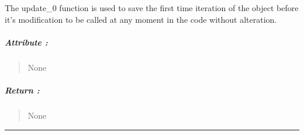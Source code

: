 \documentclass[letterpaper,10pt,english]{sphinxmanual}
\begin{document}
\begin{fulllineitems}
\label{\detokenize{GRID_doc/TIME_GRID_doc:SL_C0de.grid.TIME_GRID.update_0}}
\pysigstartsignatures
{}
\pysigstopsignatures
\sphinxAtStartPar
The \label{\detokenize{GRID_doc/TIME_GRID_doc:update-0}}update\_0 function is used to save the first time iteration of the object before it’s modification to be called at any moment in the code without alteration.


\subparagraph{Attribute :}
\label{\detokenize{GRID_doc/TIME_GRID_doc:id16}}\begin{quote}

\sphinxAtStartPar
None
\end{quote}


\subparagraph{Return :}
\label{\detokenize{GRID_doc/TIME_GRID_doc:id17}}\begin{quote}

\sphinxAtStartPar
None
\end{quote}

\end{fulllineitems}



\bigskip\hrule\bigskip

\end{document}
